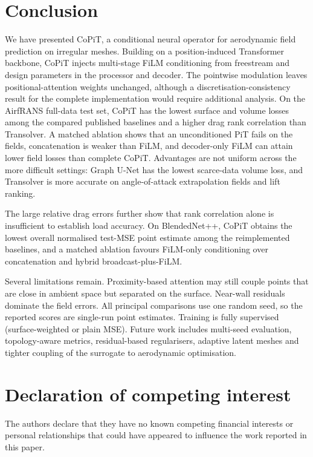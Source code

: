 \documentclass[final,3p,times]{elsarticle}
\begin{document}
\section{Conclusion}
\label{sec:conclusion}
We have presented CoPiT, a conditional neural operator for aerodynamic field prediction on irregular meshes. Building on a position-induced Transformer backbone, CoPiT injects multi-stage FiLM conditioning from freestream and design parameters in the processor and decoder. The pointwise modulation leaves positional-attention weights unchanged, although a discretisation-consistency result for the complete implementation would require additional analysis. On the AirfRANS full-data test set, CoPiT has the lowest surface and volume losses among the compared published baselines and a higher drag rank correlation than Transolver. A matched ablation shows that an unconditioned PiT fails on the fields, concatenation is weaker than FiLM, and decoder-only FiLM can attain lower field losses than complete CoPiT. Advantages are not uniform across the more difficult settings: Graph U-Net has the lowest scarce-data volume loss, and Transolver is more accurate on angle-of-attack extrapolation fields and lift ranking.

The large relative drag errors further show that rank correlation alone is insufficient to establish load accuracy. On BlendedNet++, CoPiT obtains the lowest overall normalised test-MSE point estimate among the reimplemented baselines, and a matched ablation favours FiLM-only conditioning over concatenation and hybrid broadcast-plus-FiLM.

Several limitations remain. Proximity-based attention may still couple points that are close in ambient space but separated on the surface. Near-wall residuals dominate the field errors. All principal comparisons use one random seed, so the reported scores are single-run point estimates. Training is fully supervised (surface-weighted or plain MSE). Future work includes multi-seed evaluation, topology-aware metrics, residual-based regularisers, adaptive latent meshes and tighter coupling of the surrogate to aerodynamic optimisation.

\section*{Declaration of competing interest}
The authors declare that they have no known competing financial interests or personal relationships that could have appeared to influence the work reported in this paper.
\end{document}
